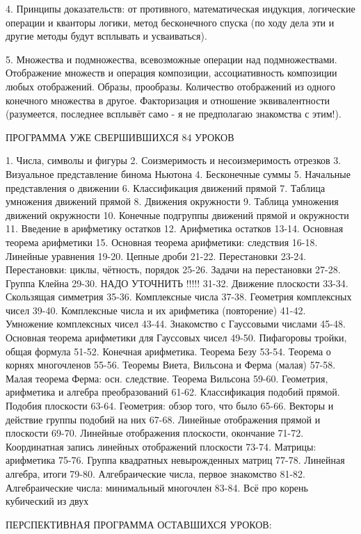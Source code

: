 4. Принципы доказательств: от противного, математическая индукция,
логические операции и кванторы логики, метод бесконечного спуска
(по ходу дела эти и другие методы будут всплывать и усваиваться).

5. Множества и подмножества, всевозможные операции над подмножествами. 
Отображение множеств и операция композиции, ассоциативность композиции 
любых отображений. Образы, прообразы. Количество отображений из одного 
конечного множества в другое. Факторизация и отношение эквивалентности
(разумеется, последнее всплывёт само - я не предполагаю знакомства с этим!).

ПРОГРАММА УЖЕ СВЕРШИВШИХСЯ 84 УРОКОВ

1. Числа, символы и фигуры
2. Соизмеримость и несоизмеримость отрезков
3. Визуальное представление бинома Ньютона
4. Бесконечные суммы
5. Начальные представления о движении
6. Классификация движений прямой
7. Таблица умножения движений прямой
8. Движения окружности
9. Таблица умножения движений окружности
10. Конечные подгруппы движений прямой и окружности
11. Введение в арифметику остатков
12. Арифметика остатков
13-14. Основная теорема арифметики
15. Основная теорема арифметики: следствия
16-18. Линейные уравнения
19-20. Цепные дроби
21-22. Перестановки
23-24. Перестановки: циклы, чётность, порядок 
25-26. Задачи на перестановки
27-28. Группа Клейна
29-30. НАДО УТОЧНИТЬ !!!!!
31-32. Движение плоскости
33-34. Скользящая симметрия
35-36. Комплексные числа
37-38. Геометрия комплексных чисел
39-40. Комплексные числа и их арифметика (повторение)
41-42. Умножение комплексных чисел
43-44. Знакомство с Гауссовыми числами
45-48. Основная теорема арифметики для Гауссовых чисел
49-50. Пифагоровы тройки, общая формула
51-52. Конечная арифметика. Теорема Безу
53-54. Теорема о корнях многочленов
55-56. Теоремы Виета, Вильсона и Ферма (малая)
57-58. Малая теорема Ферма: осн. следствие. Теорема Вильсона
59-60. Геометрия, арифметика и алгебра преобразований
61-62. Классификация подобий прямой. Подобия плоскости
63-64. Геометрия: обзор того, что было
65-66. Векторы и действие группы подобий на них
67-68. Линейные отображения прямой и плоскости
69-70. Линейные отображения плоскости, окончание
71-72. Координатная запись линейных отображений плоскости
73-74. Матрицы: арифметика
75-76. Группа квадратных невырожденных матриц
77-78. Линейная алгебра, итоги
79-80. Алгебраические числа, первое знакомство
81-82. Алгебраические числа: минимальный многочлен
83-84. Всё про корень кубический из двух

ПЕРСПЕКТИВНАЯ ПРОГРАММА ОСТАВШИХСЯ УРОКОВ:

